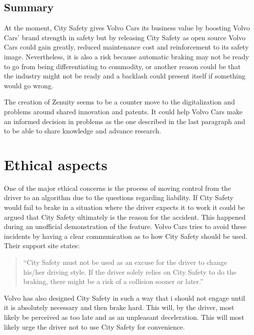 \documentclass[conference]{IEEEtran}
\begin{document}
\subsection{Summary}
At the moment, City Safety gives Volvo Cars its business value by boosting Volvo Cars' brand strength in safety but by releasing City Safety as open source Volvo Cars could gain greatly, reduced maintenance cost and reinforcement to its safety image. Nevertheless, it is also a risk because automatic braking may not be ready to go from being differentiating to commodity, or another reason could be that the industry might not be ready and a backlash could present itself if something would go wrong.

The creation of Zenuity seems to be a counter move to the digitalization and problems around shared innovation and patents. It could help Volvo Cars make an informed decision in problems as the one described in the last paragraph and to be able to share knowledge and advance research.


\section{Ethical aspects}
One of the major ethical concerns is the process of moving control from the driver to an algorithm due to the questions regarding liability. If City Safety would fail to brake in a situation where the driver expects it to work it could be argued that City Safety ultimately is the reason for the accident. This happened during an unofficial demonstration of the feature. \cite{CitySafetyFail} Volvo Cars tries to avoid these incidents by having a clear communication as to how City Safety should be used. Their support site states:

\begin{quotation}
	``City Safety must not be used as an excuse for the driver to change his/her driving style. If the driver solely relies on City Safety to do the braking, there might be a risk of a collision sooner or later.'' \cite{CitySafetyLegal}
\end{quotation}

Volvo has also designed City Safety in such a way that i should not engage until it is absolutely necessary and then brake hard. This will, by the driver, most likely be perceived as too late and as an unpleasant deceleration. This will most likely urge the driver not to use City Safety for convenience.
\end{document}
